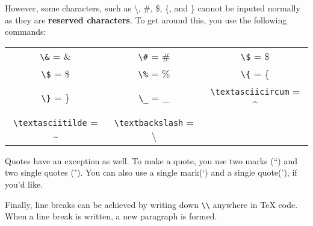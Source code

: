 However, some characters, such as \textbackslash, \#, \$, \{, and \} cannot be inputed normally as they are \textbf{reserved characters}. To get around this, you use the following commands:

\begin{center}
\begin{tabular}{ccc}
\texttt{\textbackslash \&} = \&  & \texttt{\textbackslash \#} = \#  & \texttt{\textbackslash \$} = \$  \\
\texttt{\textbackslash \$} = \$  & \texttt{\textbackslash \%} = \%  & \texttt{\textbackslash \{} = \{ \\
\texttt{\textbackslash \}} = \} & \texttt{\textbackslash \_} = \_ & \texttt{\textbackslash textasciicircum} = \textasciicircum \\
\texttt{\textbackslash textasciitilde} = \textasciitilde & \texttt{\textbackslash textbackslash} = \textbackslash
\end{tabular}
\end{center}

Quotes have an exception as well. To make a quote, you use two marks (``) and two single quotes ("). You can also use a single mark(`) and a single quote('), if you'd like. 

Finally, line breaks can be achieved by writing down \texttt{\textbackslash \textbackslash} anywhere in \TeX{} code. When a line break is written, a new paragraph is formed. 




